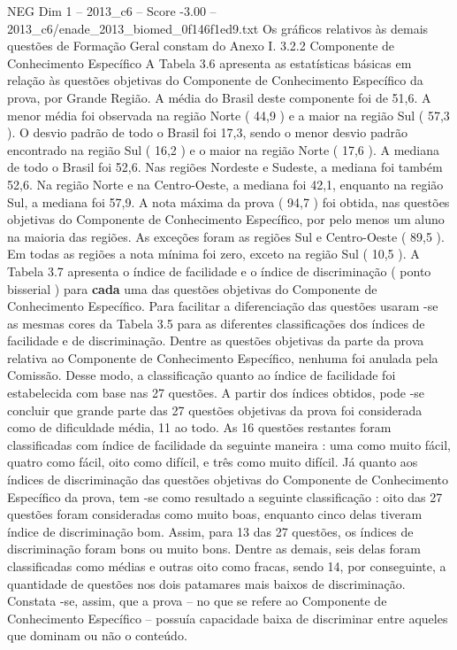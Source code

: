 \begin{textsample}{NEG Dim 1 – 2013\_c6 – Score -3.00 – 2013\_c6/enade\_2013\_biomed\_0f146f1ed9.txt}
Os gráficos relativos às demais questões de Formação Geral constam do Anexo I. 3.2.2 Componente de Conhecimento Específico A Tabela 3.6 apresenta as estatísticas básicas em relação às questões objetivas do Componente de Conhecimento Específico da prova, por Grande Região.
A média do Brasil deste componente foi de 51,6.
A menor média foi observada na região Norte ( 44,9 ) e a maior na região Sul ( 57,3 ).
O desvio padrão de todo o Brasil foi 17,3, sendo o menor desvio padrão encontrado na região Sul ( 16,2 ) e o maior na região Norte ( 17,6 ).
A mediana de todo o Brasil foi 52,6.
Nas regiões Nordeste e Sudeste, a mediana foi também 52,6.
Na região Norte e na Centro-Oeste, a mediana foi 42,1, enquanto na região Sul, a mediana foi 57,9.
A nota máxima da prova ( 94,7 ) foi obtida, nas questões objetivas do Componente de Conhecimento Específico, por pelo menos um aluno na maioria das regiões.
As exceções foram as regiões Sul e Centro-Oeste ( 89,5 ).
Em todas as regiões a nota mínima foi zero, exceto na região Sul ( 10,5 ).
A Tabela 3.7 apresenta o índice de facilidade e o índice de discriminação ( ponto bisserial ) para \textbf{cada} uma das questões objetivas do Componente de Conhecimento Específico.
Para facilitar a diferenciação das questões usaram -se as mesmas cores da Tabela 3.5 para as diferentes classificações dos índices de facilidade e de discriminação.
Dentre as questões objetivas da parte da prova relativa ao Componente de Conhecimento Específico, nenhuma foi anulada pela Comissão.
Desse modo, a classificação quanto ao índice de facilidade foi estabelecida com base nas 27 questões.
A partir dos índices obtidos, pode -se concluir que grande parte das 27 questões objetivas da prova foi considerada como de dificuldade média, 11 ao todo.
As 16 questões restantes foram classificadas com índice de facilidade da seguinte maneira : uma como muito fácil, quatro como fácil, oito como difícil, e três como muito difícil.
Já quanto aos índices de discriminação das questões objetivas do Componente de Conhecimento Específico da prova, tem -se como resultado a seguinte classificação : oito das 27 questões foram consideradas como muito boas, enquanto cinco delas tiveram índice de discriminação bom.
Assim, para 13 das 27 questões, os índices de discriminação foram bons ou muito bons.
Dentre as demais, seis delas foram classificadas como médias e outras oito como fracas, sendo 14, por conseguinte, a quantidade de questões nos dois patamares mais baixos de discriminação.
Constata -se, assim, que a prova – no que se refere ao Componente de Conhecimento Específico – possuía capacidade baixa de discriminar entre aqueles que dominam ou não o conteúdo.

\end{textsample}
